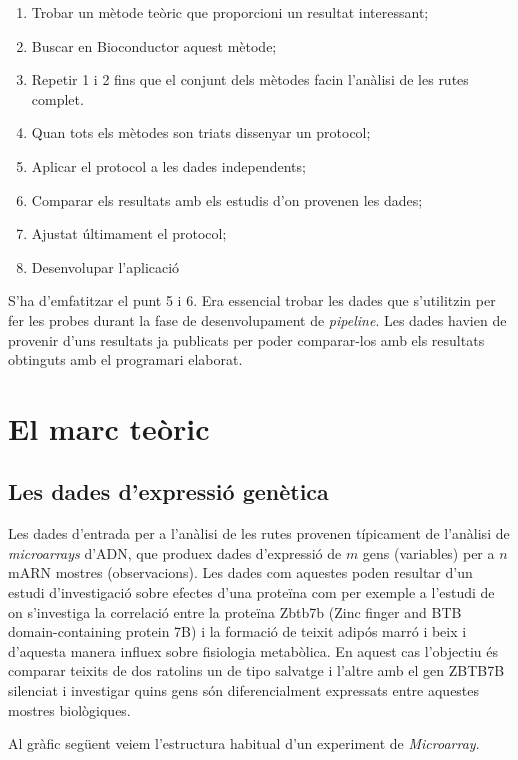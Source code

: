\documentclass[]{article}
\begin{document}
\begin{enumerate}
\item Trobar un mètode teòric que proporcioni un resultat interessant;
\item Buscar en Bioconductor aquest mètode;
\item Repetir 1 i 2 fins que el conjunt dels mètodes facin l'anàlisi de les rutes complet. 
\item Quan tots els mètodes son triats dissenyar un protocol;
\item Aplicar el protocol a les dades independents;
\item Comparar els resultats amb els estudis d'on provenen les dades;
\item Ajustat últimament el protocol;
\item Desenvolupar l'aplicació
\end{enumerate}
 
S'ha d'emfatitzar el punt 5 i 6. Era essencial trobar les dades que s'utilitzin per fer les probes durant la fase de desenvolupament de \textit{pipeline}. Les dades havien de provenir d'uns resultats ja publicats per poder comparar-los amb els resultats obtinguts amb el programari elaborat. 



\section{El marc teòric}

\subsection{Les dades d'expressió genètica}
Les dades d'entrada per a l'anàlisi de les rutes provenen típicament de l'anàlisi de \textit{microarrays} d'ADN, que produex dades d'expressió de $m$ gens (variables) per a $n$ mARN mostres (observacions). Les dades com aquestes poden resultar d'un estudi d'investigació sobre efectes d'una proteïna com per exemple a l'estudi de \cite{li2017zbtb7b} on s'investiga la correlació entre la proteïna Zbtb7b (Zinc finger and BTB domain-containing protein 7B) i la formació de teixit adipós marró i beix i d'aquesta manera influex sobre fisiologia metabòlica. En aquest cas l'objectiu és comparar teixits de dos ratolins un de tipo salvatge i l'altre amb el gen ZBTB7B silenciat i investigar quins gens són diferencialment expressats entre aquestes mostres biològiques. 

Al gràfic següent veiem l'estructura habitual d'un experiment de \textit{Microarray}.
\end{document}

